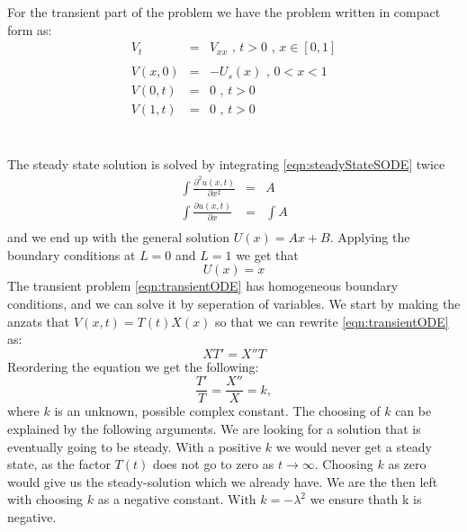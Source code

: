 \documentclass{article}
\begin{document}
For the transient part of the problem we have the problem written in compact form as:
\begin{subequations}
\begin{eqnarray}
\label{eqn:transientODE}
V_t &=& V_{xx} \textit{ , } t>0 \textit{ , } x \in [0,1] \\ \nonumber
\\
\label{eqn:transientIC}
V(x,0) &=& -U_s(x) \textit{ , } 0<x<1 \\
V(0,t) &=& 0 \textit{ , } t>0 \\
V(1,t) &=& 0 \textit{ , } t>0
\end{eqnarray}
\end{subequations}
\\
\\
The steady state solution is solved by integrating \ref{eqn:steadyStateSODE} twice
\begin{eqnarray}
\nonumber
\int \frac{\partial^2 u(x,t)}{\partial x^2} &=& A \\ \nonumber
\int \frac{\partial u(x,t)}{\partial x} &=& \int A \\ \nonumber
\end{eqnarray}
and we end up with the general solution $U(x) = Ax + B$. Applying the boundary conditions at $L=0$ and $L=1$ we get that 
\begin{equation}
U(x) = x
\label{eqn:UsteadyState1D}
\end{equation}
The transient problem \ref{eqn:transientODE} has homogeneous boundary conditions, and we can solve it by seperation of variables. We start by making the anzats that $V(x,t) = T(t)X(x)$ so that we can rewrite \ref{eqn:transientODE} as:
\begin{equation}
XT'=X''T 
\end{equation}
Reordering the equation we get the following:
\begin{equation}
\frac{T'}{T} = \frac{X''}{X} = k,
\end{equation}
where $k$ is an unknown, possible complex constant. The choosing of $k$ can be explained by the following arguments. We are looking for a solution that is eventually going to be steady. With a positive $k$ we would never get a steady state, as the factor $T(t)$ does not go to zero as $t \rightarrow \infty$. Choosing $k$ as zero would give us the steady-solution which we already have. We are the then left with choosing $k$ as a negative constant. With $k=-\lambda^2$ we ensure thath k is negative.\\
\\
\end{document}
